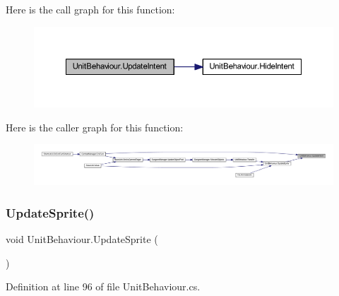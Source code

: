 Here is the call graph for this function\+:
\nopagebreak
\begin{figure}[H]
\begin{center}
\leavevmode
\includegraphics[width=350pt]{class_unit_behaviour_a38efbe995d8d2f3c522cb2fa076e79cc_cgraph}
\end{center}
\end{figure}
Here is the caller graph for this function\+:
\nopagebreak
\begin{figure}[H]
\begin{center}
\leavevmode
\includegraphics[width=350pt]{class_unit_behaviour_a38efbe995d8d2f3c522cb2fa076e79cc_icgraph}
\end{center}
\end{figure}
\mbox{\label{class_unit_behaviour_a559fdec9ef2c1c1a6c1a863cb868bce5}} 
\subsubsection{\texorpdfstring{UpdateSprite()}{UpdateSprite()}}
{\footnotesize\ttfamily void Unit\+Behaviour.\+Update\+Sprite (\begin{DoxyParamCaption}{ }\end{DoxyParamCaption})}



Definition at line 96 of file Unit\+Behaviour.\+cs.

